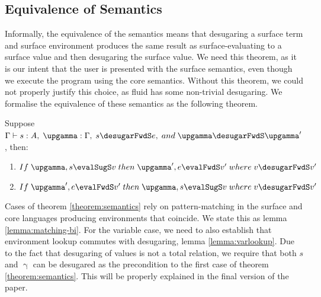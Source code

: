 \subsection{Equivalence of Semantics}
Informally, the equivalence of the semantics means that desugaring a surface term and surface environment
produces the same result as surface-evaluating to a surface value and then desugaring the surface value. We
need this theorem, as it is our intent that the user is presented with the surface semantics, even though we
execute the program using the core semantics. Without this theorem, we could not properly justify this choice,
as fluid has some non-trivial desugaring. We formalise the equivalence of these semantics as the following
theorem.
\begin{theorem}
   \label{theorem:semantics}
   Suppose $\Gamma \vdash s : A, \; \upgamma : \Gamma, \; s \desugarFwdS e, \; and \; \upgamma \desugarFwdS \upgamma'$, then:
\hfill
\begin{enumerate}
   \item $ If \; \upgamma, s \evalSugS v \; then \; \upgamma', e \evalFwdS v' \; where \; v \desugarFwdS v'$
   \item $If \; \upgamma',e \evalFwdS v' \; then \; \upgamma, s \evalSugS v \; where \; v \desugarFwdS v'$
\end{enumerate}
\end{theorem}
Cases of theorem \ref{theorem:semantics} rely on pattern-matching in the surface and core languages producing
environments that coincide. We state this as lemma \ref{lemma:matching-bi}. For the variable case, we need to
also establish that environment lookup commutes with desugaring, lemma \ref{lemma:varlookup}. Due to the fact
that desugaring of values is not a total relation, we require that both $s$ and $\upgamma$ can be desugared as
the precondition to the first case of theorem \ref{theorem:semantics}.
This will be properly explained in the final version of the paper.
